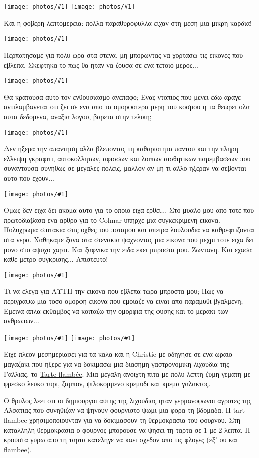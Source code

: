 \documentclass[]{book}
\newcommand\photo[1]{\noindent\texttt{[image: photos/\#1]}}
\begin{document}
\photo{103.jpg}
\photo{104.jpg}

Και η φοβερη λεπτομερεια: πολλα παραθυροφυλλα ειχαν στη μεση μια μικρη καρδια!

\photo{105.jpg}

Περπατησαμε για πολυ ωρα στα στενα, μη μπορωντας να χορτασω τις εικονες που εβλεπα. Σκεφτηκα το πως θα ηταν να ζουσα σε ενα τετοιο μερος...

\photo{106.jpg}

Θα κρατουσα αυτο τον ενθουσιασμο ανεπαφο; Ενας ντοπιος που μενει εδω αραγε αντιλαμβανεται οτι ζει σε ενα απο τα ομορφοτερα μερη του κοσμου η τα θεωρει ολα αυτα δεδομενα, αναξια λογου, βαρετα στην τελικη;

\photo{107.jpg}

Δεν ηξερα την απαντηση αλλα βλεποντας τη καθαριοτητα παντου και την πληρη ελλειψη γκραφιτι, αυτοκολλητων, αφισσων και λοιπων αισθητικων παρεμβασεων που συναντουσα συνηθως σε μεγαλες πολεις, μαλλον αν μη τι αλλο ηξεραν να σεβονται αυτο που εχουν...

\photo{108.jpg}

Ομως δεν ειχα δει ακομα αυτο για το οποιο ειχα ερθει...
Στο μυαλο μου απο τοτε που πρωτοδιαβασα ενα αρθρο για το Colmar υπηρχε μια συγκεκριμενη εικονα. Πολυχρωμα σπιτακια στις οχθες του ποταμου και απειρα λουλουδια να καθρεφτιζονται στα νερα.
Χαθηκαμε ξανα στα στενακια ψαχνοντας μια εικονα που μεχρι τοτε ειχα δει μονο στο αψυχο χαρτι.
Και ξαφνικα την ειδα εκει μπροστα μου. Ζωντανη. Και εχασα καθε μετρο συγκρισης... Απιστευτο!

\photo{109.jpg}

Τι να ελεγα για ΑΥΤΗ την εικονα που εβλεπα τωρα μπροστα μου; Πως να περιγραψω μια τοσο ομορφη εικονα που εμοιαζε να ειναι απο παραμυθι βγαλμενη;
Εμεινα απλα εκθαμβος να κοιταζω την ομορφια της φυσης και το μερακι των ανθρωπων...

\photo{110.jpg}
\photo{111.jpg}

Ειχε πλεον μεσημεριασει για τα καλα και η Christie με οδηγησε σε ενα ωραιο μαγαζακι που ηξερε για να δοκιμασω μια διασημη γαστρονομικη λιχουδια της Γαλλιας, το \href{http://en.wikipedia.org/wiki/Tarte_flamb%C3%A9e}{Tarte flambée}. Μια μεγαλη ανοιχτη πιτα με πολυ λεπτη ζυμη γεματη με φρεσκο λευκο τυρι, ζαμπον, ψιλοκομμενο κρεμυδι και κρεμα γαλακτος.

Ο θρυλος λεει οτι οι δημιουργοι αυτης της λιχουδιας ηταν γερμανοφωνοι αγροτες της Αλσατιας που συνηθιζαν να ψηνουν φουρνιστο ψωμι μια φορα τη βδομαδα. Η tart flambee χρησιμοποιουνταν για να δοκιμασουν τη θερμοκρασια του φουρνου. Στη καταλληλη θερμοκρασια ο φουρνος μπορουσε να ψησει τη ταρτα σε 1 με 2 λεπτα. Η κρουστα γυρω απο τη ταρτα κατεληγε να καει σχεδον απο τις φλογες (εξ' ου και flambee).
\end{document}
